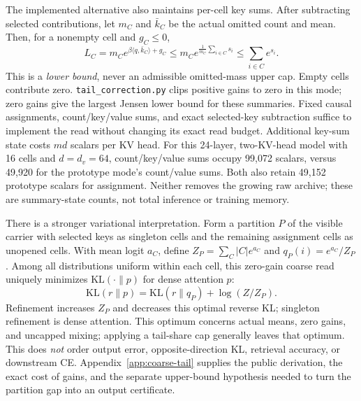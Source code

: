 \documentclass[11pt]{article}
\numberwithin{equation}{section}
\newcommand{\inner}[2]{\langle #1, #2\rangle}
\begin{document}
The implemented alternative also maintains per-cell key sums. After subtracting selected contributions,
let $m_C$ and $\bar k_C$ be the actual omitted count and mean. Then, for a nonempty cell and $g_C\le0$,
\begin{equation}\label{eq:coarse-jensen}
L_C=m_C e^{\beta\inner{q}{\bar k_C}+g_C}
\le m_C e^{\frac1{m_C}\sum_{i\in C}s_i}
\le\sum_{i\in C}e^{s_i}.
\end{equation}
This is a \emph{lower bound}, never an admissible omitted-mass upper cap. Empty cells contribute zero.
\texttt{tail\_correction.py} clips positive gains to zero in this mode; zero gains give the largest Jensen
lower bound for these summaries. Fixed causal assignments, count/key/value sums, and exact selected-key
subtraction suffice to implement the read without changing its exact read budget. Additional key-sum
state costs $md$ scalars per KV head. For this 24-layer, two-KV-head model with 16 cells and
$d=d_v=64$, count/key/value sums occupy 99,072 scalars, versus 49,920 for the prototype mode's
count/value sums. Both also retain 49,152 prototype scalars for assignment. Neither removes the growing
raw archive; these are summary-state counts, not total inference or training memory.

There is a stronger variational interpretation. Form a partition $P$ of the visible carrier with selected
keys as singleton cells and the remaining assignment cells as unopened cells. With mean logit $a_C$,
define $Z_P=\sum_C |C|e^{a_C}$ and $q_P(i)=e^{a_C}/Z_P$. Among all distributions uniform within each
cell, this zero-gain coarse read uniquely minimizes $\mathrm{KL}(\cdot\|p)$ for dense attention $p$:
\begin{equation}\label{eq:coarse-pythagoras}
\mathrm{KL}(r\|p)=\mathrm{KL}(r\|q_P)+\log(Z/Z_P).
\end{equation}
Refinement increases $Z_P$ and decreases this optimal reverse KL; singleton refinement is dense attention.
This optimum concerns actual means, zero gains, and uncapped mixing; applying a tail-share cap generally
leaves that optimum.
This does \emph{not} order output error, opposite-direction KL, retrieval accuracy, or downstream CE.
Appendix~\ref{app:coarse-tail} supplies the public derivation, the exact cost of gains, and the separate
upper-bound hypothesis needed to turn the partition gap into an output certificate.
\end{document}

